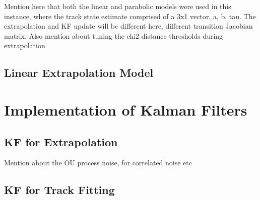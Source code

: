 Mention here that both the linear and parabolic models were used in this instance, where the track state estimate comprised of a 3x1 vector, a, b, tau. The extrapolation and KF update will be different here, different transition Jacobian matrix. Also mention about tuning the chi2 distance thresholds during extrapolation


\subsection{Linear Extrapolation Model}


\section{Implementation of Kalman Filters}
\label{gnn-kf-implementation}

\subsection{KF for Extrapolation}
Mention about the OU process noise, for correlated noise etc

\subsection{KF for Track Fitting}



